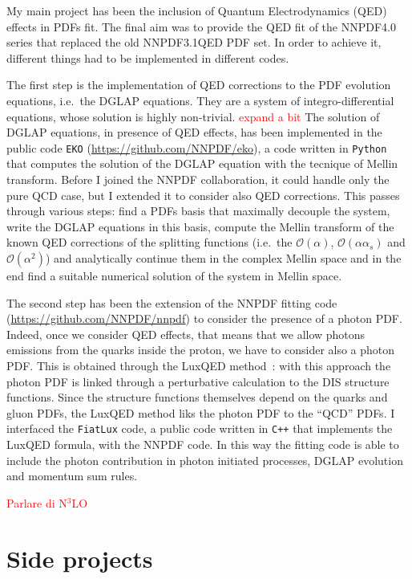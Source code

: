 \documentclass[11pt,a4paper]{moderncv}        %
\begin{document}
My main project has been the inclusion of Quantum Electrodynamics (QED) effects in PDFs fit.
The final aim was to provide the QED fit of the NNPDF4.0 series that replaced the old NNPDF3.1QED PDF set.
In order to achieve it, different things had to be implemented in different codes.

The first step is the implementation of QED corrections to the PDF evolution equations, i.e.\ the DGLAP equations.
They are a system of integro-differential equations, whose solution is highly non-trivial. \textcolor{red}{expand a bit}
The solution of DGLAP equations, in presence of QED effects, has been implemented in the public code \texttt{EKO}
(\url{https://github.com/NNPDF/eko}), a code written in \texttt{Python} that computes the solution of the DGLAP equation with the
tecnique of Mellin transform.
Before I joined the NNPDF collaboration, it could handle only the pure QCD case, but I extended it to consider also QED corrections.
This passes through various steps: find a PDFs basis that maximally decouple the system, write the DGLAP equations in this basis,
compute the Mellin transform of the known QED corrections of the splitting functions
(i.e.\ the $\mathcal{O}(\alpha)$, $\mathcal{O}(\alpha \alpha_s)$ and $\mathcal{O}(\alpha^2)$) and analytically continue them in the complex Mellin space
and in the end find a suitable numerical solution of the system in Mellin space.

The second step has been the extension of the NNPDF fitting code (\url{https://github.com/NNPDF/nnpdf}) to consider the presence of
a photon PDF.
Indeed, once we consider QED effects, that means that we allow photons emissions from the quarks inside the proton, we have to consider also
a photon PDF.
This is obtained through the LuxQED method~\cite{Manohar:2016nzj, Manohar:2017eqh}: with this approach the photon PDF is linked through
a perturbative calculation to the DIS structure functions.
Since the structure functions themselves depend on the quarks and gluon PDFs, the LuxQED method liks the photon PDF to the ``QCD'' PDFs.
I interfaced the \texttt{FiatLux} code, a public code written in \texttt{C++} that implements the LuxQED formula, with the NNPDF code.
In this way the fitting code is able to include the photon contribution in photon initiated processes, DGLAP evolution and momentum sum rules.



\textcolor{red}{Parlare di N$^3$LO}

\section{Side projects}


\end{document}
